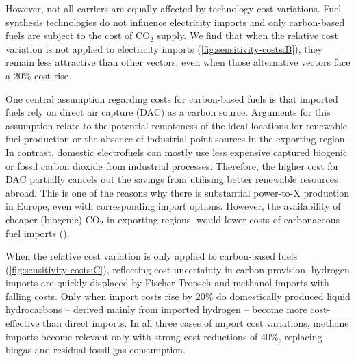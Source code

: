 However, not all carriers are equally affected by technology cost variations.
Fuel synthesis technologies do not influence electricity imports and only
carbon-based fuels are subject to the cost of CO$_2$ supply. We find that when
the relative cost variation is not applied to electricity imports
(\cref{fig:sensitivity-costs:B}), they remain less attractive than other vectors, even when those alternative vectors face a 20\% cost rise.

One central assumption regarding costs for carbon-based fuels is that imported
fuels rely on direct air capture (DAC) as a carbon source. Arguments for this
assumption relate to the potential remoteness of the ideal locations for
renewable fuel production or the absence of industrial point sources in the
exporting region. In contrast, domestic electrofuels can mostly use less
expensive captured biogenic or fossil carbon dioxide from industrial processes.
Therefore, the higher cost for DAC partially cancels out the savings from
utilising better renewable resources abroad. This is one of the reasons why
there is substantial power-to-X production in Europe, even with corresponding
import options. However, the availability of cheaper (biogenic) CO$_2$ in
exporting regions, would lower costs of carbonaceous fuel imports
().

When the relative cost variation is only applied to carbon-based fuels
(\cref{fig:sensitivity-costs:C}), reflecting cost uncertainty in carbon
provision, hydrogen imports are quickly displaced by Fischer-Tropsch and
methanol imports with falling costs. Only when import costs rise by 20\% do
domestically produced liquid hydrocarbons -- derived mainly from imported
hydrogen -- become more cost-effective than direct imports. In all three cases
of import cost variations, methane imports become relevant only with strong cost
reductions of 40\%, replacing biogas and residual fossil gas consumption.

